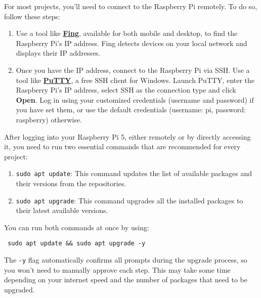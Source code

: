 For most projects, you'll need to connect to the Raspberry Pi remotely. To do so, follow these steps:
\begin{enumerate}
\item Use a tool like \href{https://www.fing.com/}{\textbf{\color{blue}Fing}}, available for both mobile and desktop, to find the Raspberry Pi's IP address. Fing detects devices on your local network and displays their IP addresses.
\item Once you have the IP address, connect to the Raspberry Pi via SSH. Use a tool like \href{https://www.chiark.greenend.org.uk/~sgtatham/putty/}{\textbf{\color{blue}PuTTY}}, a free SSH client for Windows. Launch PuTTY, enter the Raspberry Pi's IP address, select SSH as the connection type and click \textbf{Open}. Log in using your customized credentials (username and password) if you have set them, or use the default credentials (username: pi, password: raspberry) otherwise.
\end{enumerate}

After logging into your Raspberry Pi 5, either remotely or by directly accessing it, you need to run two essential commands that are recommended for every project:
\begin{enumerate}
\item \texttt{sudo apt update}: This command updates the list of available packages and their versions from the repositories.
\item \texttt{sudo apt upgrade}: This command upgrades all the installed packages to their latest available versions.
\end{enumerate}

You can run both commands at once by using:
\begin{verbatim} sudo apt update && sudo apt upgrade -y \end{verbatim}

The \texttt{-y} flag automatically confirms all prompts during the upgrade process, so you won't need to manually approve each step. This may take some time depending on your internet speed and the number of packages that need to be upgraded.